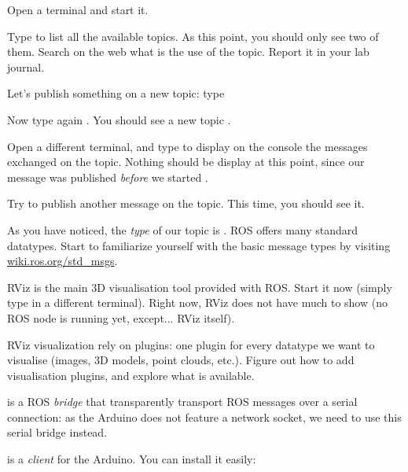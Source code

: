\documentclass{instructions}
\begin{document}
Open a terminal and start it.

Type  to list all the available topics. As this point, you should only see two of them. Search on the web what is the use of the  topic. Report it in your lab journal.

Let's publish something on a new topic: type 

Now type again . You should see a new topic .

Open a different terminal, and type  to display on the
console the messages exchanged on the  topic. Nothing should be
display at this point, since our  message was published
\emph{before} we started .

Try to publish another message on the  topic. This time, you should
see it.


As you have noticed, the \emph{type} of our  topic is
. ROS offers many standard datatypes. Start to familiarize
yourself with the basic message types by visiting
\href{http://wiki.ros.org/std_msgs}{wiki.ros.org/std\_msgs}.


RViz is the main 3D visualisation tool provided with ROS. Start it now (simply
type  in a different terminal). Right now, RViz does not have much to
show (no ROS node is running yet, except... RViz itself).

RViz visualization rely on plugins: one plugin for every datatype we want to
visualise (images, 3D models, point clouds, etc.). Figure out how to add
visualisation plugins, and explore what is available.


 is a ROS \emph{bridge} that transparently transport ROS messages
over a serial connection: as the Arduino does not feature a network socket, we
need to use this serial bridge instead.

 is a  \emph{client} for the Arduino.
You can install it easily:\\
\end{document}

